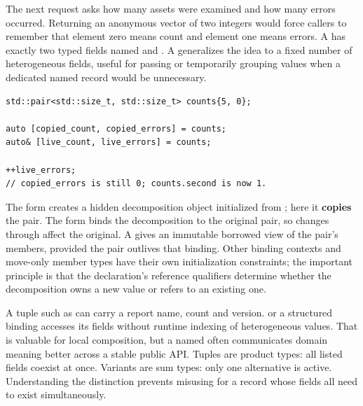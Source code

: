 \hypertarget{05-engine-i-ch006-a-report-contains-several-related-values-what-is-the-correct-shape}{}

The next request asks how many assets were examined and how many errors occurred. Returning an anonymous vector of two integers would force callers to remember that element zero means count and element one means errors. A  has exactly two typed fields named  and . A  generalizes the idea to a fixed number of heterogeneous fields, useful for passing or temporarily grouping values when a dedicated named record would be unnecessary.

\begin{verbatim}
std::pair<std::size_t, std::size_t> counts{5, 0};

auto [copied_count, copied_errors] = counts;
auto& [live_count, live_errors] = counts;

++live_errors;
// copied_errors is still 0; counts.second is now 1.
\end{verbatim}

The  form creates a hidden decomposition object initialized from ; here it \textbf{copies} the pair. The  form binds the decomposition to the original pair, so changes through  affect the original. A  gives an immutable borrowed view of the pair's members, provided the pair outlives that binding. Other binding contexts and move-only member types have their own initialization constraints; the important principle is that the declaration's reference qualifiers determine whether the decomposition owns a new value or refers to an existing one.

A tuple such as  can carry a report name, count and version.  or a structured binding accesses its fields without runtime indexing of heterogeneous values. That is valuable for local composition, but a named  often communicates domain meaning better across a stable public API. Tuples are product types: all listed fields coexist at once. Variants are sum types: only one alternative is active. Understanding the distinction prevents misusing  for a record whose fields all need to exist simultaneously.

